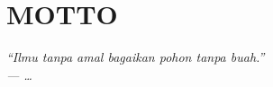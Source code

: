 \chapter*{MOTTO}

\vspace{2\baselineskip}

\begin{center}
\itshape
``Ilmu tanpa amal bagaikan pohon tanpa buah.''\\[0.4\baselineskip]
--- \ldots
\end{center}
